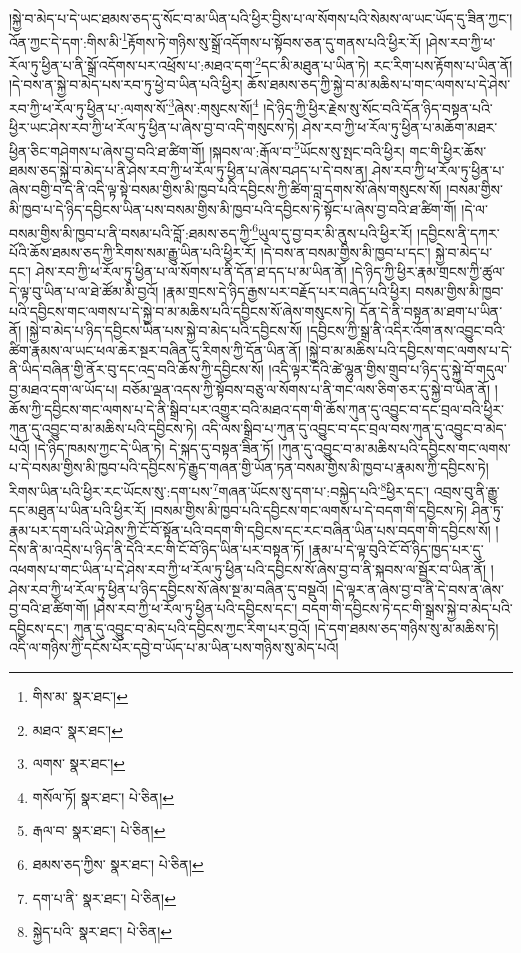 །སྐྱེ་བ་མེད་པ་དེ་ཡང་ཐམས་ཅད་དུ་སོང་བ་མ་ཡིན་པའི་ཕྱིར་བྱིས་པ་ལ་སོགས་པའི་སེམས་ལ་ཡང་ཡོད་དུ་ཟིན་ཀྱང་། འོན་ཀྱང་དེ་དག་:གིས་མི་\footnote{གིས་མ་  སྣར་ཐང་། }རྟོགས་ཏེ་གཉིས་སུ་སྒྲོ་འདོགས་པ་སྟོབས་ཅན་དུ་གནས་པའི་ཕྱིར་རོ། །ཤེས་རབ་ཀྱི་ཕ་རོལ་ཏུ་ཕྱིན་པ་ནི་སྒྲོ་འདོགས་པར་འཕྲོས་པ་:མཐའ་དག་\footnote{མཐའ་  སྣར་ཐང་། }དང་མི་མཐུན་པ་ཡིན་ཏེ། རང་རིག་པས་རྟོགས་པ་ཡིན་ནོ། །དེ་བས་ན་སྐྱེ་བ་མེད་པས་རབ་ཏུ་ཕྱེ་བ་ཡིན་པའི་ཕྱིར། ཆོས་ཐམས་ཅད་ཀྱི་སྐྱེ་བ་མ་མཆིས་པ་གང་ལགས་པ་དེ་ཤེས་རབ་ཀྱི་ཕ་རོལ་ཏུ་ཕྱིན་པ་:ལགས་སོ་\footnote{ལགས་  སྣར་ཐང་། }ཞེས་:གསུངས་སོ།\footnote{གསོལ་ཏོ།  སྣར་ཐང་།  པེ་ཅིན། } །དེ་ཉིད་ཀྱི་ཕྱིར་རྗེས་སུ་སོང་བའི་དོན་ཉིད་བསྟན་པའི་ཕྱིར་ཡང་ཤེས་རབ་ཀྱི་ཕ་རོལ་ཏུ་ཕྱིན་པ་ཞེས་བྱ་བ་འདི་གསུངས་ཏེ། ཤེས་རབ་ཀྱི་ཕ་རོལ་ཏུ་ཕྱིན་པ་མཆོག་མཐར་ཕྱིན་ཅིང་གཤེགས་པ་ཞེས་བྱ་བའི་ཐ་ཚིག་གོ། །སྐབས་ལ་:རྒོལ་བ་\footnote{རྒལ་བ་  སྣར་ཐང་།  པེ་ཅིན། }ཡོངས་སུ་སྤང་བའི་ཕྱིར། གང་གི་ཕྱིར་ཆོས་ཐམས་ཅད་སྐྱེ་བ་མེད་པ་ནི་ཤེས་རབ་ཀྱི་ཕ་རོལ་ཏུ་ཕྱིན་པ་ཞེས་བཤད་པ་དེ་བས་ན། ཤེས་རབ་ཀྱི་ཕ་རོལ་ཏུ་ཕྱིན་པ་ཞེས་བགྱི་བ་དེ་ནི་འདི་ལྟ་སྟེ་བསམ་གྱིས་མི་ཁྱབ་པའི་དབྱིངས་ཀྱི་ཚིག་བླ་དགས་སོ་ཞེས་གསུངས་སོ། །བསམ་གྱིས་མི་ཁྱབ་པ་དེ་ཉིད་དབྱིངས་ཡིན་པས་བསམ་གྱིས་མི་ཁྱབ་པའི་དབྱིངས་ཏེ་སྟོང་པ་ཞེས་བྱ་བའི་ཐ་ཚིག་གོ། །དེ་ལ་བསམ་གྱིས་མི་ཁྱབ་པ་ནི་བསམ་པའི་བློ་:ཐམས་ཅད་ཀྱི་\footnote{ཐམས་ཅད་ཀྱིས་  སྣར་ཐང་།  པེ་ཅིན། }ཡུལ་དུ་བྱ་བར་མི་ནུས་པའི་ཕྱིར་རོ། །དབྱིངས་ནི་དཀར་པོའི་ཆོས་ཐམས་ཅད་ཀྱི་རིགས་སམ་རྒྱུ་ཡིན་པའི་ཕྱིར་རོ། །དེ་བས་ན་བསམ་གྱིས་མི་ཁྱབ་པ་དང་། སྐྱེ་བ་མེད་པ་དང་། ཤེས་རབ་ཀྱི་ཕ་རོལ་ཏུ་ཕྱིན་པ་ལ་སོགས་པ་ནི་དོན་ཐ་དད་པ་མ་ཡིན་ནོ། །དེ་ཉིད་ཀྱི་ཕྱིར་རྣམ་གྲངས་ཀྱི་ཚུལ་དེ་ལྟ་བུ་ཡིན་པ་ལ་ཐེ་ཚོམ་མི་བྱའོ། །རྣམ་གྲངས་དེ་ཉིད་རྒྱས་པར་བརྗོད་པར་བཞེད་པའི་ཕྱིར། བསམ་གྱིས་མི་ཁྱབ་པའི་དབྱིངས་གང་ལགས་པ་དེ་སྐྱེ་བ་མ་མཆིས་པའི་དབྱིངས་སོ་ཞེས་གསུངས་ཏེ། དོན་དེ་ནི་བསྟན་མ་ཐག་པ་ཡིན་ནོ། །སྐྱེ་བ་མེད་པ་ཉིད་དབྱིངས་ཡིན་པས་སྐྱེ་བ་མེད་པའི་དབྱིངས་སོ། །དབྱིངས་ཀྱི་སྒྲ་ནི་འདིར་འོག་ནས་འབྱུང་བའི་ཚིག་རྣམས་ལ་ཡང་ཕལ་ཆེར་སྔར་བཞིན་དུ་རིགས་ཀྱི་དོན་ཡིན་ནོ། །སྐྱེ་བ་མ་མཆིས་པའི་དབྱིངས་གང་ལགས་པ་དེ་ནི་ཡིད་བཞིན་གྱི་ནོར་བུ་དང་འདྲ་བའི་ཆོས་ཀྱི་དབྱིངས་སོ། །འདི་ལྟར་དེའི་ཚེ་ལྷུན་གྱིས་གྲུབ་པ་ཉིད་དུ་སྐྱེ་བོ་གདུལ་བྱ་མཐའ་དག་ལ་ཡོད་པ། བཅོམ་ལྡན་འདས་ཀྱི་སྟོབས་བཅུ་ལ་སོགས་པ་ནི་གང་ལས་ཅིག་ཅར་དུ་སྐྱེ་བ་ཡིན་ནོ། །ཆོས་ཀྱི་དབྱིངས་གང་ལགས་པ་དེ་ནི་སྒྲིབ་པར་འགྱུར་བའི་མཐའ་དག་གི་ཆོས་ཀུན་དུ་འབྱུང་བ་དང་བྲལ་བའི་ཕྱིར་ཀུན་དུ་འབྱུང་བ་མ་མཆིས་པའི་དབྱིངས་ཏེ། འདི་ལས་སྒྲིབ་པ་ཀུན་དུ་འབྱུང་བ་དང་བྲལ་བས་ཀུན་དུ་འབྱུང་བ་མེད་པའོ། །དེ་ཉིད་ཁམས་ཀྱང་དེ་ཡིན་ཏེ། དེ་སྐད་དུ་བསྟན་ཟིན་ཏོ། །ཀུན་དུ་འབྱུང་བ་མ་མཆིས་པའི་དབྱིངས་གང་ལགས་པ་དེ་བསམ་གྱིས་མི་ཁྱབ་པའི་དབྱིངས་ཏེ་རྒྱུད་གཞན་གྱི་ཡོན་ཏན་བསམ་གྱིས་མི་ཁྱབ་པ་རྣམས་ཀྱི་དབྱིངས་ཏེ། རིགས་ཡིན་པའི་ཕྱིར་རང་ཡོངས་སུ་:དག་པས་\footnote{དག་པ་ནི་  སྣར་ཐང་།  པེ་ཅིན། }གཞན་ཡོངས་སུ་དག་པ་:བསྐྱེད་པའི་\footnote{སྐྱེད་པའི་  སྣར་ཐང་།  པེ་ཅིན། }ཕྱིར་དང་། འབྲས་བུ་ནི་རྒྱུ་དང་མཐུན་པ་ཡིན་པའི་ཕྱིར་རོ། །བསམ་གྱིས་མི་ཁྱབ་པའི་དབྱིངས་གང་ལགས་པ་དེ་བདག་གི་དབྱིངས་ཏེ། ཤིན་ཏུ་རྣམ་པར་དག་པའི་ཡེ་ཤེས་ཀྱི་ངོ་བོ་སྟོན་པའི་བདག་གི་དབྱིངས་དང་རང་བཞིན་ཡིན་པས་བདག་གི་དབྱིངས་སོ། །དེས་ནི་མ་འདྲེས་པ་ཉིད་ནི་དེའི་རང་གི་ངོ་བོ་ཉིད་ཡིན་པར་བསྟན་ཏོ། །རྣམ་པ་དེ་ལྟ་བུའི་ངོ་བོ་ཉིད་ཁྱད་པར་དུ་འཕགས་པ་གང་ཡིན་པ་དེ་ཤེས་རབ་ཀྱི་ཕ་རོལ་ཏུ་ཕྱིན་པའི་དབྱིངས་སོ་ཞེས་བྱ་བ་ནི་སྐབས་ལ་སྦྱོར་བ་ཡིན་ནོ། །ཤེས་རབ་ཀྱི་ཕ་རོལ་ཏུ་ཕྱིན་པ་ཉིད་དབྱིངས་སོ་ཞེས་སྔ་མ་བཞིན་དུ་བསྡུའོ། །དེ་ལྟར་ན་ཞེས་བྱ་བ་ནི་དེ་བས་ན་ཞེས་བྱ་བའི་ཐ་ཚིག་གོ། །ཤེས་རབ་ཀྱི་ཕ་རོལ་ཏུ་ཕྱིན་པའི་དབྱིངས་དང་། བདག་གི་དབྱིངས་ཏེ་དང་གི་སྒྲས་སྐྱེ་བ་མེད་པའི་དབྱིངས་དང་། ཀུན་དུ་འབྱུང་བ་མེད་པའི་དབྱིངས་ཀྱང་རིག་པར་བྱའོ། །དེ་དག་ཐམས་ཅད་གཉིས་སུ་མ་མཆིས་ཏེ། འདི་ལ་གཉིས་ཀྱི་དངོས་པོར་དབྱེ་བ་ཡོད་པ་མ་ཡིན་པས་གཉིས་སུ་མེད་པའོ། 